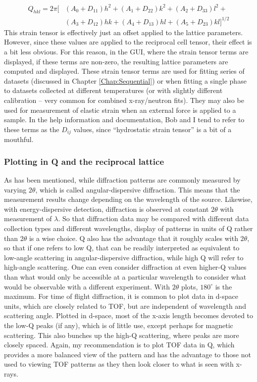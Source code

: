 \begin{equation*}
\begin{aligned}
Q_{hkl} ={} 2 \pi \Biggl[&(A_0+D_{11}) h^2 + (A_1+D_{22}) k^2 + (A_2+D_{33})l^2 + \\
& (A_3+D_{12})hk + (A_4+D_{13})hl + (A_5+D_{23}) kl\Biggr]^{1/2}
\end{aligned}
\end{equation*}
This strain tensor is effectively just an offset applied to the lattice parameters. However, since these values are applied to the reciprocal cell tensor, their effect is a bit less obvious. 
For this reason, in the GUI, where the strain tensor terms are displayed, if these terms are non-zero, the resulting lattice parameters are computed and displayed. 
These strain tensor terms are used for fitting series of datasets (discussed in Chapter \ref{Chap:Sequential}) or when fitting a single phase to datasets collected at different temperatures (or with slightly different calibration -- very common for combined x-ray/neutron fits). They may also be used for measurement of elastic strain when an external force is applied to a sample. In the help information and documentation, Bob and I tend to refer to these terms as the $D_{ij}$ values, since ``hydrostatic strain tensor'' is a bit of a mouthful. 

\subsubsection{Plotting in Q and the reciprocal lattice}

As has been mentioned, while diffraction patterns are commonly measured by varying $2\theta$, which is called angular-dispersive diffraction. This means that the measurement results change depending on the wavelength of the source. 
Likewise, with energy-dispersive detection, diffraction is observed at constant $2\theta$ with measurement of $\lambda$. So that diffraction data may be compared with different data collection types and different wavelengths, display of patterns in units of Q rather than $2\theta$ is a wise choice. Q also has the advantage that it roughly scales with $2\theta$, so that if one refers to low Q, that can be readily interpreted as equivalent to low-angle scattering in angular-dispersive diffraction, while high Q will refer to high-angle scattering. One can even consider diffraction at even higher-Q values than what would only be accessible at a particular wavelength to consider what would be observable with a different experiment. With $2\theta$ plots, $180^\circ$ is the maximum. For time of flight diffraction, it is common to plot data in d-space units, which are closely related to TOF, but are independent of wavelength and scattering angle. Plotted in d-space, most of the x-axis length becomes devoted to the low-Q peaks (if any), which is of little use, except perhaps for magnetic scattering. This also bunches up the high-Q scattering, where peaks are more closely spaced. Again, my recommendation is to plot TOF data in Q, which provides a more balanced view of the pattern and has the advantage to those not used to viewing TOF patterns as they then look closer to what is seen with x-rays. 

